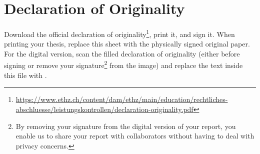 \chapter*{Declaration of Originality}

{\color{red}
Download the official declaration of originality\footnote{\url{https://www.ethz.ch/content/dam/ethz/main/education/rechtliches-abschluesse/leistungskontrollen/declaration-originality.pdf}}, print it, and sign it.
When printing your thesis, replace this sheet with the physically signed original paper.
For the digital version, scan the filled declaration of originality (either before signing or remove your signature\footnote{%
  By removing your signature from the digital version of your report, you enable us to share your report with collaborators without having to deal with privacy concerns.
} from the image) and replace the text inside this file with \verb||.
}
